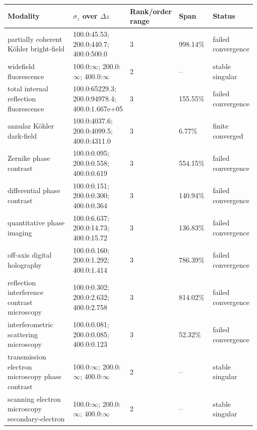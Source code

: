 \begin{tabular}{p{0.30\linewidth}p{0.22\linewidth}p{0.16\linewidth}p{0.14\linewidth}p{0.16\linewidth}}
\toprule
Modality & $\sigma_z$ over $\Delta z$ & Rank/order range & Span & Status \\
\midrule
partially coherent Köhler bright-field & 100.0:45.53; 200.0:440.7; 400.0:500.0 & 3 & 998.14\% & failed convergence \\
widefield fluorescence & 100.0:$\infty$; 200.0:$\infty$; 400.0:$\infty$ & 2 & -- & stable singular \\
total internal reflection fluorescence & 100.0:65229.3; 200.0:94978.4; 400.0:1.667e+05 & 3 & 155.55\% & failed convergence \\
annular Köhler dark-field & 100.0:4037.6; 200.0:4099.5; 400.0:4311.0 & 3 & 6.77\% & finite converged \\
Zernike phase contrast & 100.0:0.095; 200.0:0.558; 400.0:0.619 & 3 & 554.15\% & failed convergence \\
differential phase contrast & 100.0:0.151; 200.0:0.300; 400.0:0.364 & 3 & 140.94\% & failed convergence \\
quantitative phase imaging & 100.0:6.637; 200.0:14.73; 400.0:15.72 & 3 & 136.83\% & failed convergence \\
off-axis digital holography & 100.0:0.160; 200.0:1.292; 400.0:1.414 & 3 & 786.39\% & failed convergence \\
reflection interference contrast microscopy & 100.0:0.302; 200.0:2.632; 400.0:2.758 & 3 & 814.02\% & failed convergence \\
interfero\allowbreak{}metric scattering microscopy & 100.0:0.081; 200.0:0.085; 400.0:0.123 & 3 & 52.32\% & failed convergence \\
transmission electron microscopy phase contrast & 100.0:$\infty$; 200.0:$\infty$; 400.0:$\infty$ & 2 & -- & stable singular \\
scanning electron microscopy secondary-electron & 100.0:$\infty$; 200.0:$\infty$; 400.0:$\infty$ & 2 & -- & stable singular \\
\bottomrule
\end{tabular}
